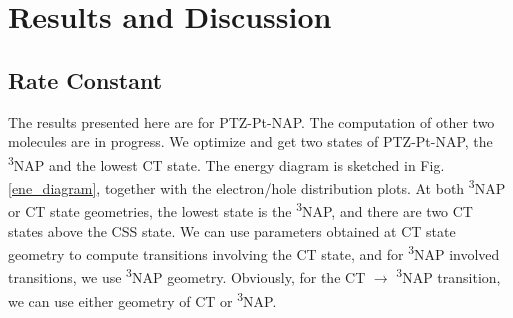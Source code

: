 


\section{Results and Discussion} %

\subsection{Rate Constant}
The results presented here are for PTZ-Pt-NAP. The computation of other two molecules are in progress. We optimize and get two states of PTZ-Pt-NAP, the \textsuperscript{3}NAP and the lowest CT state. The energy diagram is sketched in Fig. \ref{ene_diagram}, together with the electron/hole distribution plots. At both \textsuperscript{3}NAP or CT state geometries, the lowest state is the \textsuperscript{3}NAP, and there are two CT states above the CSS state. We can use parameters obtained at CT state geometry to compute transitions involving the CT state, and  for \textsuperscript{3}NAP involved transitions, we use  \textsuperscript{3}NAP geometry. Obviously, for the CT $\rightarrow$ \textsuperscript{3}NAP transition, we can use either geometry of CT or \textsuperscript{3}NAP.



